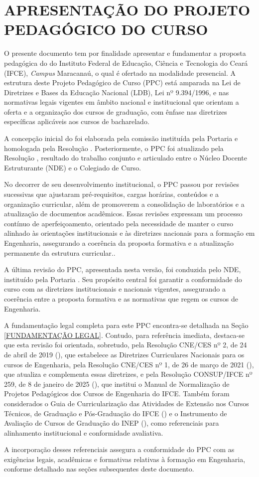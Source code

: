 \clearpage
\section{\MakeUppercase{Apresentação do Projeto Pedagógico do Curso}}


O presente documento tem por finalidade apresentar e fundamentar a proposta pedagógica do \NOMECURSO do Instituto Federal de Educação, Ciência e Tecnologia do Ceará (IFCE), \textit{Campus} Maracanaú, o qual é ofertado na modalidade presencial. A estrutura deste Projeto Pedagógico de Curso (PPC) está amparada na Lei de Diretrizes e Bases da Educação Nacional (LDB), Lei nº 9.394/1996, e nas normativas legais vigentes em âmbito nacional e institucional que orientam a oferta e a organização dos cursos de graduação, com ênfase nas diretrizes específicas aplicáveis aos cursos de bacharelado.

A concepção inicial do \textbf{\NOMECURSO} foi elaborada pela comissão instituída pela Portaria \textbf{\PORTARIACOMISSAO} e homologada pela Resolução \textbf{\RESOLUCAOAPROVACAO}. Posteriormente, o PPC foi atualizado pela Resolução \textbf{\RESOLUCAOAPROVACAONOVA}, resultado do trabalho conjunto e articulado entre o Núcleo Docente Estruturante (NDE) e o Colegiado de Curso. 

No decorrer de seu desenvolvimento institucional, o PPC passou por revisões sucessivas que ajustaram pré-requisitos, cargas horárias, conteúdos e a organização curricular, além de promoverem a consolidação de laboratórios e a atualização de documentos acadêmicos. Essas revisões expressam um processo contínuo de aperfeiçoamento, orientado pela necessidade de manter o curso alinhado às orientações institucionais e às diretrizes nacionais para a formação em Engenharia, assegurando a coerência da proposta formativa e a atualização permanente da estrutura curricular..

A última revisão do PPC, apresentada nesta versão, foi conduzida pelo NDE, instituído pela Portaria \PORTARIANDEATUAL. Seu propósito central foi garantir a conformidade do curso com as diretrizes institucionais e nacionais vigentes, assegurando a coerência entre a proposta formativa e as normativas que regem os cursos de Engenharia.

A fundamentação legal completa para este PPC encontra-se detalhada na Seção \ref{FUNDAMENTAÇÃO LEGAL}. Contudo, para referência imediata, destaca-se que esta revisão foi orientada, sobretudo, pela Resolução CNE/CES nº 2, de 24 de abril de 2019 (), que estabelece as Diretrizes Curriculares Nacionais para os cursos de Engenharia, pela Resolução CNE/CES nº 1, de 26 de março de 2021 (), que atualiza e complementa essas diretrizes, e pela Resolução CONSUP/IFCE nº 259, de 8 de janeiro de 2025 (), que institui o Manual de Normalização de Projetos Pedagógicos dos Cursos de Engenharia do IFCE. Também foram considerados o Guia de Curricularização das Atividades de Extensão nos Cursos Técnicos, de Graduação e Pós-Graduação do IFCE () e o Instrumento de Avaliação de Cursos de Graduação do INEP (), como referenciais para alinhamento institucional e conformidade avaliativa.


A incorporação desses referenciais assegura a conformidade do PPC com as exigências legais, acadêmicas e formativas relativas à formação em Engenharia, conforme detalhado nas seções subsequentes deste documento.
